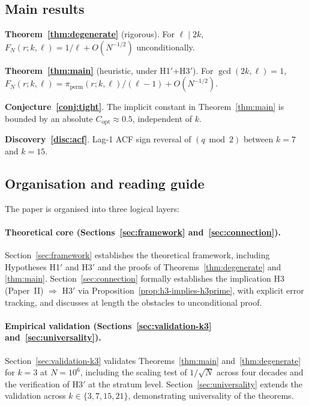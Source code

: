 \documentclass[11pt,a4paper]{article}
\theoremstyle{plain}
\theoremstyle{definition}
\newcommand{\PiP}{\pi_{\mathrm{perm}}}
\begin{document}
\subsection{Main results}

\textbf{Theorem~\ref{thm:degenerate}} (rigorous). For $\ell \mid 2k$,
$F_N(r; k, \ell) = 1/\ell + O(N^{-1/2})$ unconditionally.

\medskip
\textbf{Theorem~\ref{thm:main}} (heuristic, under H1$'$+H3$'$). For
$\gcd(2k, \ell) = 1$, $F_N(r; k, \ell) = \PiP(r; k, \ell)/(\ell-1) + O(N^{-1/2})$.

\medskip
\textbf{Conjecture~\ref{conj:tight}}. The implicit constant in Theorem~\ref{thm:main}
is bounded by an absolute $C_{\mathrm{opt}} \approx 0.5$, independent of $k$.

\medskip
\textbf{Discovery~\ref{disc:acf}}. Lag-1 ACF sign reversal of $(q \bmod 2)$ between
$k = 7$ and $k = 15$.

\subsection{Organisation and reading guide}

The paper is organised into three logical layers:

\paragraph{Theoretical core (Sections~\ref{sec:framework} and~\ref{sec:connection}).}
Section~\ref{sec:framework} establishes the theoretical framework, including
Hypotheses H1$'$ and H3$'$ and the proofs of Theorems~\ref{thm:degenerate} and
\ref{thm:main}. Section~\ref{sec:connection} formally establishes the
implication H3 (Paper~II) $\Rightarrow$ H3$'$ via
Proposition~\ref{prop:h3-implies-h3prime}, with explicit error tracking, and
discusses at length the obstacles to unconditional proof.

\paragraph{Empirical validation (Sections~\ref{sec:validation-k3}
and~\ref{sec:universality}).}
Section~\ref{sec:validation-k3} validates Theorems~\ref{thm:main}
and~\ref{thm:degenerate} for $k = 3$ at $N = 10^6$, including the scaling
test of $1/\sqrt{N}$ across four decades and the verification of H3$'$ at the
stratum level. Section~\ref{sec:universality} extends the validation across
$k \in \{3, 7, 15, 21\}$, demonstrating universality of the theorems.
\end{document}
